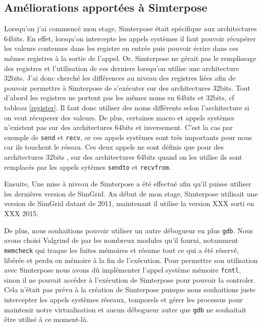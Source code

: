 \subsection{Améliorations apportées à Simterpose}

Lorsqu'on j'ai commencé mon stage, Simterpose était spécifique aux architectures 64bits. En effet, lorsqu'on intercepte les appels systèmes il faut pouvoir récupérer les valeurs contenues dans les registre en entrée puis pouvoir écrire dans ces mêmes registres à la sortie de l'appel. Or, Simterpose ne gérait pas le remplissage des registres et l'utilisation de ces derniers lorsqu'on utilise une architecture 32bits. J'ai donc cherché les différences au niveau des registres liées afin de pouvoir permettre à Simterpose de s'exécuter sur des architectures 32bits. Tout d'abord les registres ne portent pas les mêmes noms en 64bits et 32bits, cf tableau \ref{register}. Il faut donc utiliser des noms différents selon l'architecture si on veut récuperer des valeurs. De plus, certaines macro et appels systèmes n'existent pas sur des architectures 64bits et inversement. C'est la cas par exemple de \texttt{send} et \texttt{recv}, or ces appels systèmes sont très importants pour nous car ils touchent le réseau. Ces deux appels ne sont définis que pour des architectures 32bits , sur des architectures 64bits quand on les utilise ils sont remplacés par les appels sytèmes \texttt{sendto} et \texttt{recvfrom}.

Ensuite, Une mise à niveau de Simterpose a été effectué afin qu'il puisse utiliser les dernières version de SimGrid. Au début de mon stage, Simterpose utilisait une version de SimGrid datant de 2011, maintenant il utilise la version  {\color{red}XXX} sorti en {\color{red}XXX} 2015.

De plus, nous souhaitions pouvoir utiliser un autre {\color{red}débogueur} en plus \texttt{gdb}. Nous avons choisi Valgrind de par les nombreux modules qu'il fourni, notamment \texttt{memcheck} qui traque les fuites mémoires et résume tout ce qui a été réservé, libérée et perdu en mémoire à la fin de l'exécution. Pour permettre son utilisation avec Simterpose nous avons dû implémenter l'appel système mémoire \texttt{fcntl}, sinon il ne pouvait accéder à l'exécution de Simterpose pour pouvoir la controler. Cela n'était pas prévu à la création de Simterpose puisque nous souhaitions juste intercepter les appels systèmes réseaux, temporels et gérer les processus pour maintenir notre virtualisation et aucun  {\color{red}débogueur} autre que \texttt{gdb} ne souhaitait être utilisé à ce moment-là.
